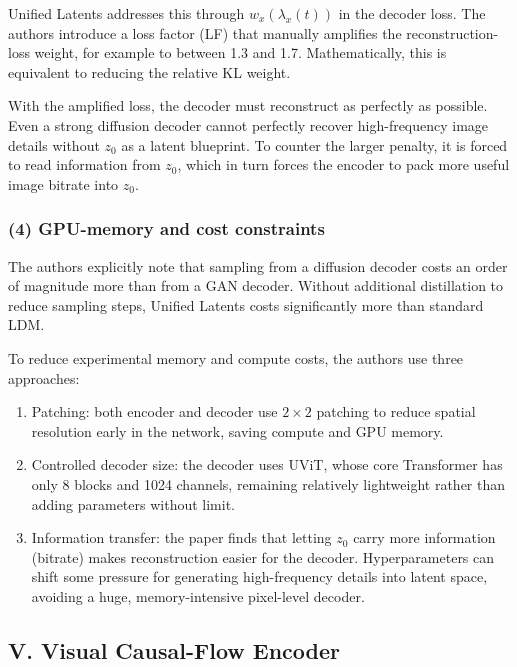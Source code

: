 Unified Latents addresses this through \(w_x(\lambda_x(t))\) in the decoder loss. The authors introduce a loss factor (LF) that manually amplifies the reconstruction-loss weight, for example to between 1.3 and 1.7. Mathematically, this is equivalent to reducing the relative KL weight.

With the amplified loss, the decoder must reconstruct as perfectly as possible. Even a strong diffusion decoder cannot perfectly recover high-frequency image details without \(z_0\) as a latent blueprint. To counter the larger penalty, it is forced to read information from \(z_0\), which in turn forces the encoder to pack more useful image bitrate into \(z_0\).

\hypertarget{gpu-memory-and-cost-constraints}{%
\subsubsection{(4) GPU-memory and cost constraints}\label{gpu-memory-and-cost-constraints}}

The authors explicitly note that sampling from a diffusion decoder costs an order of magnitude more than from a GAN decoder. Without additional distillation to reduce sampling steps, Unified Latents costs significantly more than standard LDM.

To reduce experimental memory and compute costs, the authors use three approaches:

\begin{enumerate}
\def\labelenumi{\arabic{enumi}.}
\tightlist
\item
  Patching: both encoder and decoder use \(2\times2\) patching to reduce spatial resolution early in the network, saving compute and GPU memory.
\item
  Controlled decoder size: the decoder uses UViT, whose core Transformer has only 8 blocks and 1024 channels, remaining relatively lightweight rather than adding parameters without limit.
\item
  Information transfer: the paper finds that letting \(z_0\) carry more information (bitrate) makes reconstruction easier for the decoder. Hyperparameters can shift some pressure for generating high-frequency details into latent space, avoiding a huge, memory-intensive pixel-level decoder.
\end{enumerate}

\hypertarget{v.-visual-causal-flow-encoder}{%
\subsection{V. Visual Causal-Flow Encoder}\label{v.-visual-causal-flow-encoder}}

